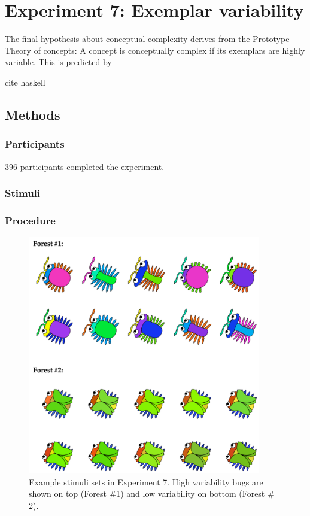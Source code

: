 \section{Experiment 7: Exemplar variability}
The final hypothesis about conceptual complexity derives from the Prototype Theory of concepts: A concept is conceptually complex if its exemplars are highly variable. This is predicted by 

cite haskell

\subsection{Methods}
\subsubsection{Participants}

396 participants completed the experiment.

\subsubsection{Stimuli} 
\subsubsection{Procedure}

  \begin{figure}
 \begin{center}
  \includegraphics[width=4in]{figs/var_screen_shot.png}
  \caption{\label{fig:var_screen_shot} Example stimuli sets in Experiment 7. High variability bugs are shown on top (Forest \#1) and low variability on bottom (Forest \# 2).}
 \end{center}
\end{figure}


